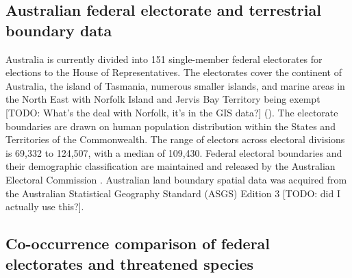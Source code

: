 \documentclass[a4paper,11pt]{article}
\begin{document}



\subsection{Australian federal electorate and terrestrial boundary data}



Australia is currently divided into 151 single-member federal electorates for elections to the House of Representatives. The electorates cover the continent of Australia, the island of Tasmania, numerous smaller islands, and marine areas in the North East with Norfolk Island and Jervis Bay Territory being exempt [TODO: What's the deal with Norfolk, it's in the GIS data?] (\cite{parliamentofaustraliaElectoralDivisions2018}). The electorate boundaries are drawn on human population distribution within the States and Territories of the Commonwealth. The range of electors across electoral divisions is 69,332 to 124,507, with a median of 109,430. Federal electoral boundaries and their demographic classification are maintained and released by the Australian Electoral Commission \cite{australiaelectoralcomissionFederalElectoralBoundaries2019}. Australian land boundary spatial data was acquired from the Australian Statistical Geography Standard (ASGS) Edition 3 \cite{australianbureauofstatisticsAustralianStatisticalGeography2021} [TODO: did I actually use this?].

\subsection{Co-occurrence comparison of federal electorates and threatened species}
\end{document}
